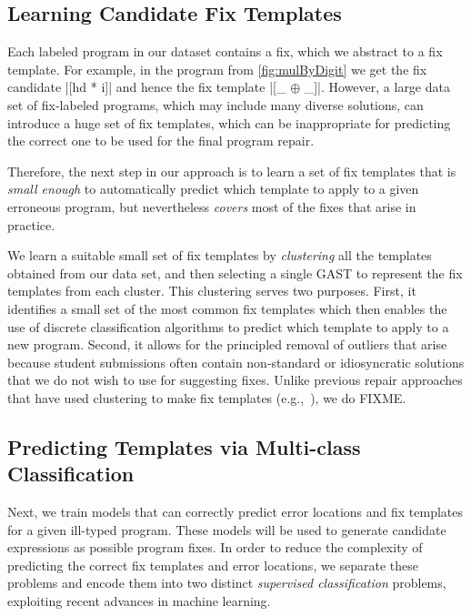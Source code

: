 \subsection{Learning Candidate Fix Templates}
\label{sec:overview:learn}

Each labeled program in our dataset contains a fix, which we abstract to a fix
template. For example, in the \mbd program from \autoref{fig:mulByDigit} we get
the fix candidate |[hd * i]| and hence the fix template |[_ $\oplus$ _]|.
However, a large data set of fix-labeled programs, which may include many
diverse solutions, can introduce a huge set of fix templates, which can be
inappropriate for predicting the correct one to be used for the final program
repair.

Therefore, the next step in our approach is to learn a set of fix templates
that is \emph{small enough} to automatically predict which template to apply to
a given erroneous program, but nevertheless \emph{covers} most of the fixes that
arise in practice.

 We learn a suitable small set of fix templates by
\emph{clustering} all the templates obtained from our data set, and then
selecting a single GAST to represent the fix templates from each cluster.
%
This clustering serves two purposes.
%
First, it identifies a small set of the most common fix templates which then
enables the use of discrete classification algorithms to predict which template
to apply to a new program.
%
Second, it allows for the principled removal of outliers that arise because
student submissions often contain non-standard or idiosyncratic solutions that
we do not wish to use for suggesting fixes.
Unlike previous repair approaches that have used clustering to make fix
templates (e.g.,~\cite{FIXME}), we do FIXME.


\subsection{Predicting Templates via Multi-class Classification}
\label{sec:overview:predict}

Next, we train models that can correctly predict error locations and fix
templates for a given ill-typed program. These models will be used to generate
candidate expressions as possible program fixes. In order to reduce the
complexity of predicting the correct fix templates and error locations, we
separate these problems and encode them into two distinct \emph{supervised
classification} problems, exploiting recent advances in machine learning.

